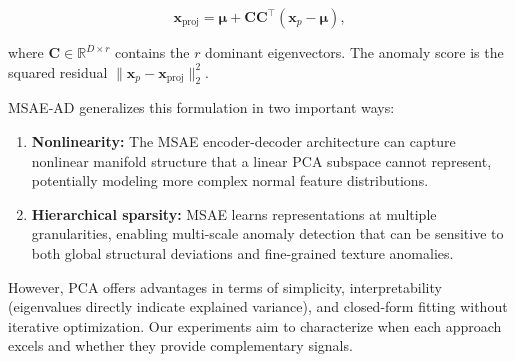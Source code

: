 \begin{equation}
    \mathbf{x}_{\text{proj}} = \boldsymbol{\mu} + \mathbf{C}\mathbf{C}^\top(\mathbf{x}_p - \boldsymbol{\mu}),
\end{equation}

where $\mathbf{C} \in \mathbb{R}^{D \times r}$ contains the $r$ dominant eigenvectors.
The anomaly score is the squared residual $\|\mathbf{x}_p - \mathbf{x}_{\text{proj}}\|_2^2$.

MSAE-AD generalizes this formulation in two important ways:
\begin{enumerate}
    \item \textbf{Nonlinearity:} The MSAE encoder-decoder architecture can capture nonlinear manifold structure that a linear PCA subspace cannot represent, potentially modeling more complex normal feature distributions.
    \item \textbf{Hierarchical sparsity:} MSAE learns representations at multiple granularities, enabling multi-scale anomaly detection that can be sensitive to both global structural deviations and fine-grained texture anomalies.
\end{enumerate}

However, PCA offers advantages in terms of simplicity, interpretability (eigenvalues directly indicate explained variance), and closed-form fitting without iterative optimization.
Our experiments aim to characterize when each approach excels and whether they provide complementary signals.
